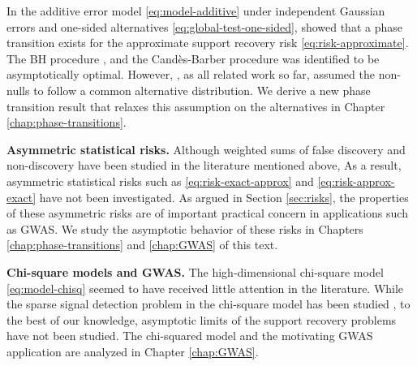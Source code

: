 In the additive error model \eqref{eq:model-additive} under independent Gaussian errors and one-sided alternatives \eqref{eq:global-test-one-sided},
\cite{arias2017distribution} showed that a phase transition exists for  the approximate support recovery risk \eqref{eq:risk-approximate}.
The \ac{BH} procedure \cite{benjamini1995controlling}, and the 
Cand\`es-Barber procedure \citep{barber2015controlling} was identified to be asymptotically optimal. %
However, \cite{arias2017distribution}, as all related work so far, assumed the non-nulls to follow a common alternative distribution.
We derive a new phase transition result that relaxes this assumption on the alternatives in Chapter \ref{chap:phase-transitions}.

\medskip

{\bf Asymmetric statistical risks.}
Although weighted sums of false discovery and non-discovery have been studied in the literature mentioned above,  As a result, asymmetric statistical risks such as \eqref{eq:risk-exact-approx} and \eqref{eq:risk-approx-exact} have not 
been investigated.
As argued in Section \ref{sec:risks}, the properties of these asymmetric risks are of important practical concern in applications such as GWAS.
We study the asymptotic behavior of these risks in Chapters \ref{chap:phase-transitions} and \ref{chap:GWAS} of this text.

\medskip

{\bf Chi-square models and GWAS.}
The high-dimensional chi-square model \eqref{eq:model-chisq} seemed to have received little attention in the literature.
While the sparse signal detection problem in the chi-square model has been studied \cite{donoho2004higher}, to the best of our knowledge,  asymptotic limits of the support recovery problems have not been studied.
The chi-squared model and the motivating GWAS application are analyzed in Chapter \ref{chap:GWAS}.

